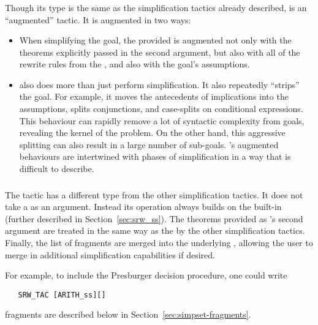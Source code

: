 \subsubsection{}

Though its type is the same as the simplification tactics already
described,  is an ``augmented'' tactic.  It is augmented
in two ways:
\begin{itemize}
\item When simplifying the goal, the provided \simpset{} is augmented
  not only with the theorems explicitly passed in the second argument,
  but also with all of the rewrite rules from the , and
  also with the goal's assumptions.
%
\item {} also does more than just perform simplification.
  It also repeatedly ``strips'' the goal.  For example, it moves the
  antecedents of implications into the assumptions, splits
  conjunctions, and case-splits on conditional expressions.  This
  behaviour can rapidly remove a lot of syntactic complexity from
  goals, revealing the kernel of the problem.  On the other hand, this
  aggressive splitting can also result in a large number of
  sub-goals.  's augmented behaviours are intertwined with
  phases of simplification in a way that is difficult to describe.
\end{itemize}

\subsubsection{}

The tactic  has a different type from the other
simplification tactics.  It does not take a \simpset{} as an argument.
Instead its operation always builds on the built-in \simpset{}
 (further described in Section~\ref{sec:srw_ss}).  The
theorems provided as 's second argument are treated in
the same way as the by the other simplification tactics.  Finally, the
list of \simpset{} fragments are merged into the underlying
\simpset{}, allowing the user to merge in additional simplification
capabilities if desired.

For example, to include the Presburger decision procedure, one could
write
\begin{verbatim}
   SRW_TAC [ARITH_ss][]
\end{verbatim}
\Simpset{} fragments are described below in
Section~\ref{sec:simpset-fragments}.

